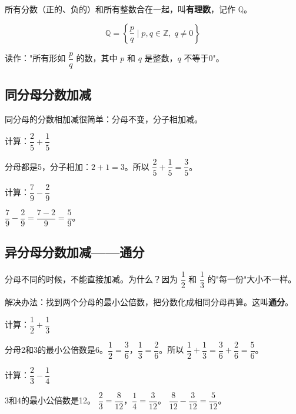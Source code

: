 所有分数（正的、负的）和所有整数合在一起，叫\textbf{有理数}，记作 $\mathbb{Q}$。

\[
\mathbb{Q} = \left\{\frac{p}{q} \mid p,q\in\mathbb{Z},\; q\neq0\right\}
\]

读作："所有形如 $\dfrac{p}{q}$ 的数，其中 $p$ 和 $q$ 是整数，$q$ 不等于0"。

\subsection*{同分母分数加减}

同分母的分数相加减很简单：分母不变，分子相加减。

\begin{example}
计算：$\dfrac{2}{5}+\dfrac{1}{5}$
\end{example}
\begin{solution}
分母都是5，分子相加：$2+1=3$。所以 $\dfrac{2}{5}+\dfrac{1}{5} = \dfrac{3}{5}$。
\end{solution}

\begin{example}
计算：$\dfrac{7}{9}-\dfrac{2}{9}$
\end{example}
\begin{solution}
$\dfrac{7}{9}-\dfrac{2}{9} = \dfrac{7-2}{9} = \dfrac{5}{9}$。
\end{solution}

\subsection*{异分母分数加减——通分}

分母不同的时候，不能直接加减。为什么？因为 $\dfrac{1}{2}$ 和 $\dfrac{1}{3}$ 的"每一份"大小不一样。

解决办法：找到两个分母的最小公倍数，把分数化成相同分母再算。这叫\textbf{通分}。

\begin{example}
计算：$\dfrac{1}{2}+\dfrac{1}{3}$
\end{example}
\begin{solution}
分母2和3的最小公倍数是6。$\dfrac{1}{2} = \dfrac{3}{6}$，$\dfrac{1}{3} = \dfrac{2}{6}$。所以
$\dfrac{1}{2}+\dfrac{1}{3} = \dfrac{3}{6}+\dfrac{2}{6} = \dfrac{5}{6}$。
\end{solution}

\begin{example}
计算：$\dfrac{2}{3}-\dfrac{1}{4}$
\end{example}
\begin{solution}
3和4的最小公倍数是12。
$\dfrac{2}{3} = \dfrac{8}{12}$，$\dfrac{1}{4} = \dfrac{3}{12}$。
$\dfrac{8}{12}-\dfrac{3}{12} = \dfrac{5}{12}$。
\end{solution}

